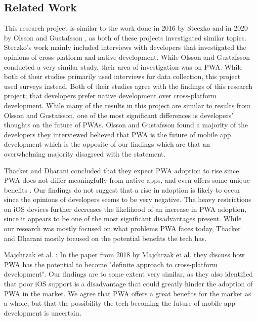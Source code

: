 \documentclass[a4paper,12pt]{article}
\begin{document}
\subsection{Related Work}
\label{Discussion_relatedWork}
This research project is similar to the work done in 2016 by Steczko \cite{thesis_steczko} and in 2020 by Olsson and Gustafsson \cite{thesis_sverige}, as both of these projects investigated similar topics. Steczko's work mainly included interviews with developers that investigated the opinions of cross-platform and native development. While Olsson and Gustafsson conducted a very similar study, their area of investigation was on PWA. While both of their studies primarily used interviews for data collection, this project used surveys instead. Both of their studies agree with the findings of this research project; that developers prefer native development over cross-platform development. While many of the results in this project are similar to results from Olsson and Gustafsson, one of the most significant differences is developers' thoughts on the future of PWAs. Olsson and Gustafsson found a majority of the developers they interviewed believed that PWA is the future of mobile app development which is the opposite of our findings which are that an overwhelming majority disagreed with the statement.

Thacker and Dharani concluded that they expect PWA adoption to rise since PWA does not differ meaningfully from native apps, and even offers some unique benefits \cite{realize_native_with_pwa}. Our findings do not suggest that a rise in adoption is likely to occur since the opinions of developers seems to be very negative. The heavy restrictions on iOS devices further decreases the likelihood of an increase in PWA adoption, since it appears to be one of the most significant disadvantages present. While our research was mostly focused on what problems PWA faces today, Thacker and Dharani mostly focused on the potential benefits the tech has.

Majchrzak et al. \cite{pwa_definite_approach}: In the paper from 2018 by Majchrzak et al. they discuss how PWA has the potential to become "definite approach to cross-platform development". Our findings are to some extent very similar, as they also identified that poor iOS support is a disadvantage that could greatly hinder the adoption of PWA in the market. We agree that PWA offers a great benefits for the market as a whole, but that the possibility the tech becoming the future of mobile app development is uncertain.
\end{document}
